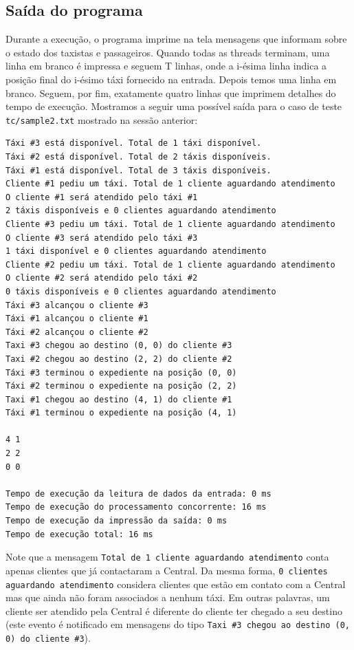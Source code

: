 \documentclass[a4paper,landscape,12pt]{article}
\begin{document}
\subsection{Saída do programa}
Durante a execução, o programa imprime na tela mensagens que informam sobre o estado dos taxistas e passageiros. Quando todas as threads terminam, uma linha em branco é impressa e seguem T linhas, onde a i-ésima linha indica a posição final do i-ésimo táxi fornecido na entrada. Depois temos uma linha em branco. Seguem, por fim, exatamente quatro linhas que imprimem detalhes do tempo de execução. Mostramos a seguir uma possível saída para o caso de teste \texttt{tc/sample2.txt} mostrado na sessão anterior:
\begin{verbatim}
Táxi #3 está disponível. Total de 1 táxi disponível.
Táxi #2 está disponível. Total de 2 táxis disponíveis.
Táxi #1 está disponível. Total de 3 táxis disponíveis.
Cliente #1 pediu um táxi. Total de 1 cliente aguardando atendimento
O cliente #1 será atendido pelo táxi #1
2 táxis disponíveis e 0 clientes aguardando atendimento
Cliente #3 pediu um táxi. Total de 1 cliente aguardando atendimento
O cliente #3 será atendido pelo táxi #3
1 táxi disponível e 0 clientes aguardando atendimento
Cliente #2 pediu um táxi. Total de 1 cliente aguardando atendimento
O cliente #2 será atendido pelo táxi #2
0 táxis disponíveis e 0 clientes aguardando atendimento
Táxi #3 alcançou o cliente #3
Táxi #1 alcançou o cliente #1
Táxi #2 alcançou o cliente #2
Taxi #3 chegou ao destino (0, 0) do cliente #3
Taxi #2 chegou ao destino (2, 2) do cliente #2
Táxi #3 terminou o expediente na posição (0, 0)
Táxi #2 terminou o expediente na posição (2, 2)
Taxi #1 chegou ao destino (4, 1) do cliente #1
Táxi #1 terminou o expediente na posição (4, 1)

4 1
2 2
0 0

Tempo de execução da leitura de dados da entrada: 0 ms
Tempo de execução do processamento concorrente: 16 ms
Tempo de execução da impressão da saída: 0 ms
Tempo de execução total: 16 ms
\end{verbatim}

Note que a mensagem \texttt{Total de 1 cliente aguardando atendimento} conta apenas clientes que já contactaram a Central. Da mesma forma, \texttt{0 clientes aguardando atendimento} considera clientes que estão em contato com a Central mas que ainda não foram associados a nenhum táxi. Em outras palavras, um cliente ser atendido pela Central é diferente do cliente ter chegado a seu destino (este evento é notificado em mensagens do tipo \texttt{Taxi \#3 chegou ao destino (0, 0) do cliente \#3}).
\end{document}

